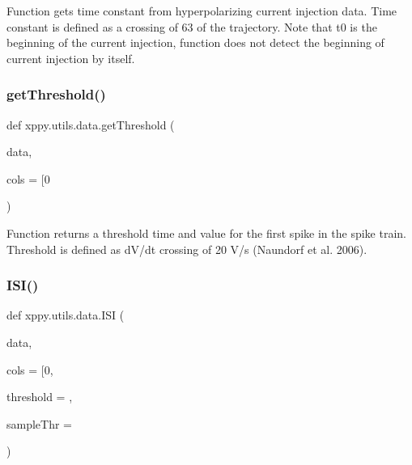 \begin{DoxyVerb}Function gets time constant from hyperpolarizing current injection data.
Time constant is defined as a crossing of 63%
of the trajectory. Note that t0 is the beginning of the current injection,
function does not detect the beginning of current injection by itself.
\end{DoxyVerb}
 \mbox{\label{namespacexppy_1_1utils_1_1data_a813c03dadd59868d94ee0ad6039848a3}} 
\subsubsection{\texorpdfstring{get\+Threshold()}{getThreshold()}}
{\footnotesize\ttfamily def xppy.\+utils.\+data.\+get\+Threshold (\begin{DoxyParamCaption}\item[{}]{data,  }\item[{}]{cols = {\ttfamily \mbox{[}0} }\end{DoxyParamCaption})}

\begin{DoxyVerb}Function returns a threshold time and value for the first spike in the spike train.
Threshold is defined as dV/dt crossing of 20 V/s (Naundorf et al. 2006).
\end{DoxyVerb}
 \mbox{\label{namespacexppy_1_1utils_1_1data_a106565881aecee459e3af1b3b2778731}} 
\subsubsection{\texorpdfstring{I\+S\+I()}{ISI()}}
{\footnotesize\ttfamily def xppy.\+utils.\+data.\+I\+SI (\begin{DoxyParamCaption}\item[{}]{data,  }\item[{}]{cols = {\ttfamily \mbox{[}0},  }\item[{}]{threshold = {},  }\item[{}]{sample\+Thr = {} }\end{DoxyParamCaption})}

